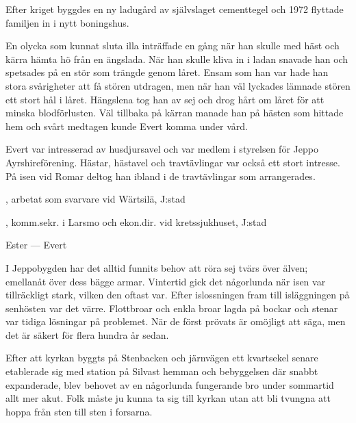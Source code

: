 Efter kriget byggdes en ny ladugård av självslaget cementtegel och 1972 flyttade familjen in i nytt boningshus.

En olycka som kunnat sluta illa inträffade en gång när han skulle med häst och kärra hämta hö från en ängslada. När han skulle kliva in i ladan snavade han och spetsades på en stör som trängde genom låret. Ensam som han var hade han stora svårigheter att få stören utdragen, men när han väl lyckades lämnade stören ett stort hål i låret. Hängslena tog han av sej och drog hårt om låret för att minska blodförlusten. Väl tillbaka på kärran manade han på hästen som hittade hem och svårt medtagen kunde Evert komma under vård.

Evert var intresserad av husdjursavel och var medlem i styrelsen för Jeppo Ayrshireförening. Hästar, hästavel och travtävlingar var också ett stort intresse. På isen vid Romar deltog han ibland i de travtävlingar som arrangerades.
\begin{jhchildren}
  \item {}
  \item {}, arbetat som svarvare vid Wärtsilä, J:stad
  \item {}
  \item {}, komm.sekr. i Larsmo och ekon.dir. vid kretssjukhuset, J:stad
\end{jhchildren}
Ester   ---  Evert 



%

I Jeppobygden har det alltid funnits behov att röra sej tvärs över älven; emellanåt över dess bägge armar. Vintertid gick det någorlunda när isen var tillräckligt stark, vilken den oftast var. Efter islossningen fram till isläggningen på senhösten var det värre. Flottbroar och enkla broar lagda på bockar och stenar var tidiga lösningar på problemet. När de först prövats är omöjligt att säga, men det är säkert för flera hundra år sedan.

Efter att kyrkan byggts på Stenbacken och järnvägen ett kvartsekel senare etablerade sig med station på Silvast hemman och bebyggelsen där snabbt expanderade, blev behovet av en någorlunda fungerande bro under sommartid allt mer akut. Folk måste ju kunna ta sig till kyrkan utan att bli tvungna att hoppa från sten till sten i forsarna.

